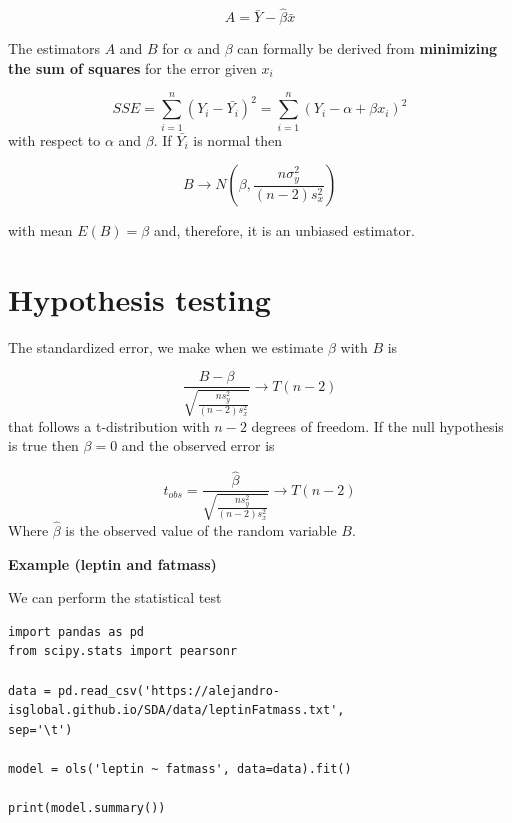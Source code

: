 \documentclass[
]{book}
\begin{document}
\[A=\bar{Y}- \hat{\beta}\bar{x}\]

The estimators \(A\) and \(B\) for \(\alpha\) and \(\beta\) can formally be derived from \textbf{minimizing the sum of squares} for the error given \(x_i\)

\[SSE=\sum_{i=1}^n(Y_i-\bar{Y_i})^2=\sum_{i=1}^n(Y_i-\alpha + \beta x_i)^2\]
with respect to \(\alpha\) and \(\beta\). If \(\bar{Y_i}\) is normal then

\[B \rightarrow N(\beta, \frac{n\sigma^2_y}{{(n-2)s^2_x}})\]

with mean \(E(B)=\beta\) and, therefore, it is an unbiased estimator.

\hypertarget{hypothesis-testing-2}{%
\section{Hypothesis testing}\label{hypothesis-testing-2}}

The standardized error, we make when we estimate \(\beta\) with \(B\) is

\[\frac{B -\beta}{\sqrt{\frac{ns^2_y}{{(n-2)s^2_x}}}} \rightarrow T(n-2)\]
that follows a t-distribution with \(n-2\) degrees of freedom. If the null hypothesis is true then \(\beta=0\) and the observed error is

\[t_{obs}= \frac{\hat{\beta}}{\sqrt{\frac{ns^2_y}{{(n-2)s^2_x}}}} \rightarrow T(n-2)\]
Where \(\hat{\beta}\) is the observed value of the random variable \(B\).

\textbf{Example (leptin and fatmass)}

We can perform the statistical test

\begin{verbatim}
import pandas as pd
from scipy.stats import pearsonr

data = pd.read_csv('https://alejandro-isglobal.github.io/SDA/data/leptinFatmass.txt', 
sep='\t')

model = ols('leptin ~ fatmass', data=data).fit()

print(model.summary())
\end{verbatim}
\end{document}
